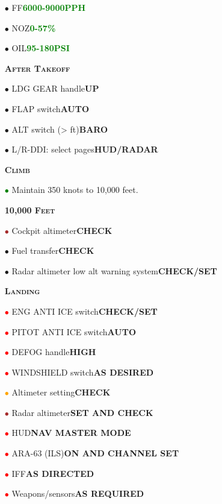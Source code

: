 \documentclass[a4paper,12pt,dvipsnames]{letter}
\newcommand{\button}[1]{\textbf{#1}}
\newcommand{\ok}[1]{\textcolor{Green}{\textbf{#1}}}
\newcommand{\myHead}[1]{{\LARGE\textsc{\textbf{#1}}}}
\newcommand{\myhead}[1]{{\large\textsc{\textbf{#1}}}}
\newcommand{\bi}{\textcolor{ProcessBlue}{$\bullet$\;}}
\newcommand{\ri}{\textcolor{Red}{$\bullet$\;}}
\newcommand{\gi}{\textcolor{Green}{$\bullet$\;}}
\newcommand{\oi}{\textcolor{Orange}{$\bullet$\;}}
\renewcommand{\ni}{\textcolor{Brown}{$\bullet$\;}}
\begin{document}
{\begin{itemize}
\begin{itemize}
  \item[\bi] FF\dotfill\ok{6000-9000\;PPH}
  \item[\bi] NOZ\dotfill\ok{0-57\%}
  \item[\bi] OIL\dotfill\ok{95-180\;PSI}
 \end{itemize}
\end{itemize} 
\vspace{0.5em}
\begin{itemize}
 \item[] \myHead{After Takeoff}
 \item[\bi] LDG GEAR handle\dotfill\button{UP}
 \item[\bi] FLAP switch\dotfill\button{AUTO}
 \item[\bi] ALT switch (> ft)\dotfill\button{BARO}
 \item[\bi] L/R-DDI: select pages\dotfill\button{HUD/RADAR}
\end{itemize}
\newpage
\begin{itemize}
 \item[] \myHead{Climb}
 \item[\gi] Maintain 350 knots to 10,000 feet.
 \vspace{0.3em}
 \item[] \myhead{10,000 Feet}
 \item[\ni] Cockpit altimeter\dotfill\button{CHECK}
 \item[\bi] Fuel transfer\dotfill\button{CHECK}
 \item[\bi] Radar altimeter low alt warning system\dotfill\button{CHECK/SET}
\end{itemize}
\vspace{0.5em}
\begin{itemize}
 \item[] \myHead{Landing}
 \item[\ri] ENG ANTI ICE switch\dotfill\button{CHECK/SET}
 \item[\ri] PITOT ANTI ICE switch\dotfill\button{AUTO}
 \item[\ri] DEFOG handle\dotfill\button{HIGH}
 \item[\ri] WINDSHIELD switch\dotfill\button{AS DESIRED}
 \item[\oi] Altimeter setting\dotfill\button{CHECK}
 \item[\ni] Radar altimeter\dotfill\button{SET AND CHECK}
 \item[\ri] HUD\dotfill\button{NAV MASTER MODE}
 \item[\ri] ARA-63 (ILS)\dotfill\button{ON AND CHANNEL SET}
 \item[\ri] IFF\dotfill\button{AS DIRECTED}
 \item[\ri] Weapons/sensors\dotfill\button{AS REQUIRED}
\end{itemize} 
%
}
\end{document}
